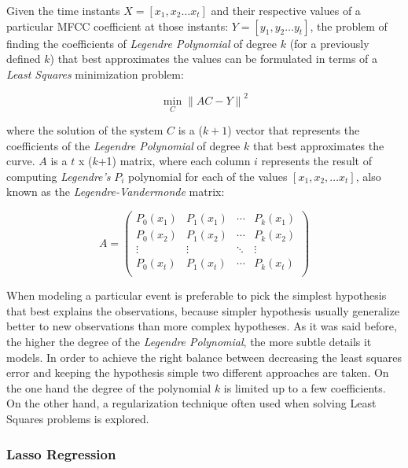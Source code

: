 Given the time instants $X=[x_{1}, x_{2} \dotsc x_{t}]$ and their respective values of a particular
MFCC coefficient at those instants: $Y=[y_{1}, y_{2} \dotsc y_{t}]$,
the problem of finding the coefficients of \textit{Legendre Polynomial} of degree $k$
(for a previously defined $k$) that best approximates
the values can be formulated in terms of a \textit{Least Squares} minimization problem:

\begin{equation}
  \min_{C} {\| AC - Y \|}^{2}
\end{equation}

where the solution of the system $C$ is a ($k+1$) vector that represents the coefficients
of the \textit{Legendre Polynomial} of degree $k$ that best approximates the curve.
$A$ is a $t$ x ($k$+1) matrix, where each column $i$ represents the result of computing
\textit{Legendre's} $P_{i}$ polynomial for each of the values
$[x_{1}, x_{2}, \dotsc x_{t}]$, also known as the \textit{Legendre-Vandermonde} matrix:

\begin{equation}
  A =
    \begin{pmatrix}
      P_{0}(x_{1}) & P_{1}(x_{1}) & \cdots & P_{k}(x_{1}) \\
      P_{0}(x_{2}) & P_{1}(x_{2}) & \cdots & P_{k}(x_{2}) \\
      \vdots & \vdots & \ddots & \vdots \\
      P_{0}(x_{t}) & P_{1}(x_{t}) & \cdots & P_{k}(x_{t}) \\
    \end{pmatrix}
\end{equation}

When modeling a particular event is preferable to pick the simplest hypothesis that best
explains the observations, because simpler hypothesis usually generalize better to new
observations than more complex hypotheses. As it was said before, the higher the
degree of the \textit{Legendre Polynomial},
the more subtle details it models. In order to achieve the right balance between decreasing
the least squares error and keeping the hypothesis simple two different approaches are taken.
On the one hand the degree of the polynomial $k$ is limited up to a few coefficients.
On the other hand, a regularization technique
often used when solving Least Squares problems is explored.

\subsubsection{Lasso Regression}

